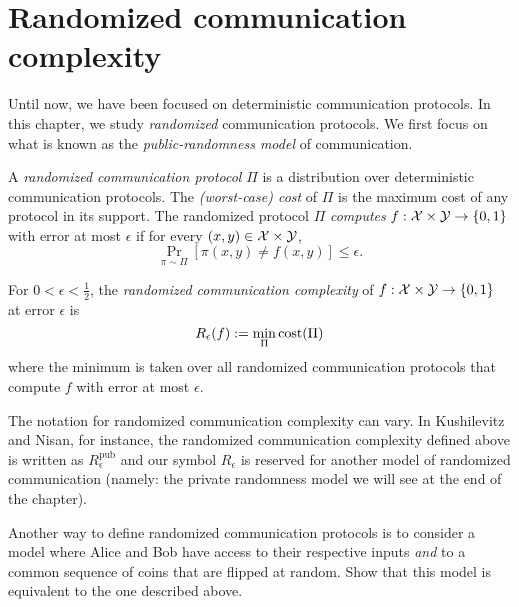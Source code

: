 \chapter[CH04]{Randomized communication complexity}



Until now, we have been focused on deterministic communication protocols. In this chapter, we study \emph{randomized} communication protocols. We first focus on what is known as the \emph{public-randomness model} of communication. 


\newpage

\begin{definition}
	A \emph{randomized communication protocol} $\Pi$ is a distribution over deterministic communication protocols. The \emph{(worst-case) cost} of $\Pi$ is the maximum cost of any protocol in its support. The randomized protocol $\Pi$ \emph{computes} $f : \mathcal{X} \times \mathcal{Y} \to \{0,1\}$ with error at most $\epsilon$ if for every $(x,y) \in \mathcal{X} \times \mathcal{Y}$,
	\[
	\Pr_{\pi \sim \Pi}[ \pi(x,y) \neq f(x,y) ] \le \epsilon.
	\]
\end{definition}


\begin{definition}
	For $0 < \epsilon < \frac12$, the \emph{randomized communication complexity} of $f : \mathcal{X} \times \mathcal{Y} \to \{0,1\}$ at error $\epsilon$ is
	\[
	R_\epsilon(f) := \min_{\Pi} \mathrm{cost}(\Pi)
	\]
	where the minimum is taken over all randomized communication protocols that compute $f$ with error at most $\epsilon$.
\end{definition}

\begin{remark}
	The notation for randomized communication complexity can vary. In Kushilevitz and Nisan, for instance, the randomized communication complexity defined above is written as $R^{\mathrm{pub}}_\epsilon$ and our symbol $R_\epsilon$ is reserved for another model of randomized communication (namely: the private randomness model we will see at the end of the chapter).
\end{remark}

\exercises

\begin{exercise}
	Another way to define randomized communication protocols is to consider a model where Alice and Bob have access to their respective inputs \emph{and} to a common sequence of coins that are flipped at random. Show that this model is equivalent to the one described above.
\end{exercise}

